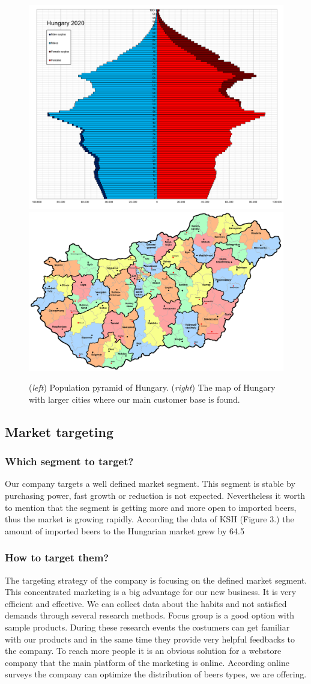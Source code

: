 \begin{figure}[H]
  \centering
  \includegraphics[width=0.45\linewidth]{pics/hungary.png}
  \includegraphics[width=0.45\linewidth]{pics/magyar.jpg}
  \caption{(\textit{left}) Population pyramid of Hungary.  (\textit{right}) The map of Hungary with larger cities where our main customer base is found.}
  \label{fig:hu}
\end{figure}

\subsection{Market targeting}

\subsubsection*{Which segment to target?}

Our company targets a well defined market segment. This segment is stable by purchasing power, fast growth or reduction is not expected. Nevertheless it worth to mention that the segment is getting more and more open to imported beers, thus the market is growing rapidly. According the data of KSH (Figure 3.) the amount of imported beers to the Hungarian market grew by 64.5%


\subsubsection*{How to target them?}

The targeting strategy of the company is focusing on the defined market segment. This concentrated marketing is a big advantage for our new business. It is very efficient and effective. We can collect data about the habits and not satisfied demands through several research methods.
Focus group is a good option with sample products. During these research events the costumers can get familiar with our products and in the same time they provide very helpful feedbacks to the company. To reach more people it is an obvious solution for a webstore company that the main platform of the marketing is online. According online surveys the company can optimize the distribution of beers types, we are offering.


